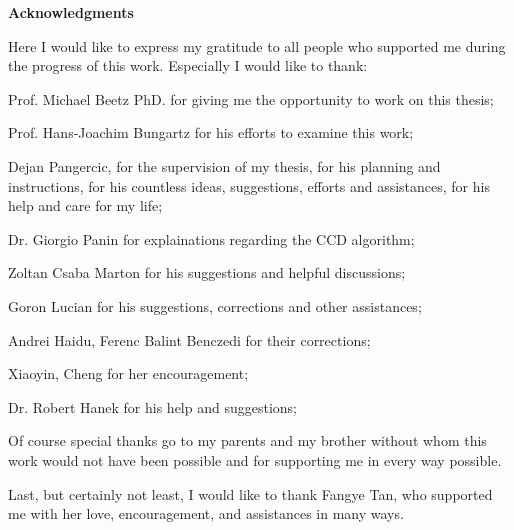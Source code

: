 \clearemptydoublepage
{}
{}        



\vspace*{2cm}

\begin{center}
{\Large \bf Acknowledgments}
\end{center}

\vspace{1cm}




Here I would like to express my gratitude to all people who supported me during the
progress of this work. Especially I would like to thank:

Prof. Michael Beetz PhD. for giving me the opportunity to work on this thesis;

Prof. Hans-Joachim Bungartz for his efforts to examine this work;

Dejan Pangercic, for the supervision of my thesis, for his planning and instructions,
for his countless ideas, suggestions, efforts and assistances, for his help and care for
my life;

Dr. Giorgio Panin for explainations regarding the CCD algorithm;

Zoltan Csaba Marton for his suggestions and helpful discussions;

Goron Lucian for his suggestions, corrections and other assistances;

Andrei Haidu, Ferenc Balint Benczedi for their corrections;

Xiaoyin, Cheng for her encouragement;

Dr. Robert Hanek for his help and suggestions;

Of course special thanks go to my parents and my brother without whom this work
would not have been possible and for supporting me in every way possible.

Last, but certainly not least, I would like to thank Fangye Tan, who supported me with her
love, encouragement, and assistances in many ways.

